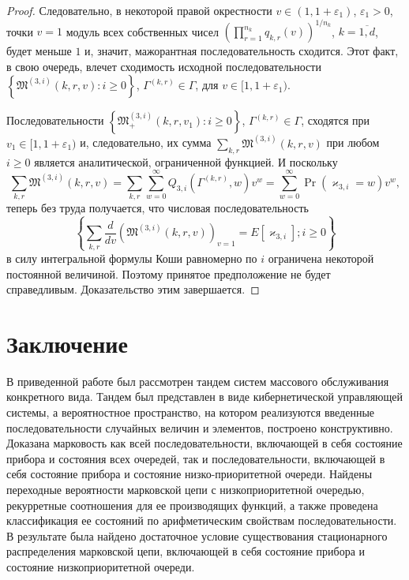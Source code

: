 \documentclass[a4paper,12pt,russian]{extarticle}
\begin{document}
\begin{proof}
Следовательно, в некоторой правой окрестности $v \in (1, 1 + \varepsilon_1)$, $\varepsilon_1 > 0$, точки $v=1$ модуль всех собственных чисел $\left(\prod_{r=1}^{n_k}q_{k,r} (v)\right)^{1/n_k}$, $k=\overline{1,d}$, будет меньше $1$ и, значит, мажорантная последовательность сходится. Этот факт, в свою очередь, влечет сходимость исходной последовательности $\left\{\mathfrak{M}^{(3,i)}(k,r,v)\colon i \geqslant 0\right\}$, $\Gamma^{(k,r)} \in \Gamma$, для $v \in [1, 1 + \varepsilon_1)$.

Последовательности $\left\{\mathfrak{M}_+^{(3,i)}(k,r,v_1)\colon i \geqslant 0\right\}$, $\Gamma^{(k,r)} \in \Gamma$, сходятся при $v_1 \in [1,1+\varepsilon_1)$ и, следовательно, их сумма 
$\sum_{k,r} \mathfrak{M}^{(3,i)}(k,r,v)$ при любом $i\geqslant 0$ является аналитической, ограниченной  функцией.
И поскольку
\begin{equation}
\sum_{k,r} \mathfrak{M}^{(3,i)}(k,r,v) = \sum_{k,r} \sum_{w=0}^{\infty} Q_{3,i}(\Gamma^{(k,r)},w) v^w = 
 \sum_{w=0}^{\infty} \Pr(\varkappa_{3,i}=w) v^w,
\end{equation}
теперь без труда получается, что числовая последовательность 
$$
\left\{\sum_{k,r} \frac{d}{dv}\left(\mathfrak{M}^{(3,i)}(k,r,v)\right)_{v=1}= E[\varkappa_{3,i}]; i\geqslant 0\right\} 
$$
в силу интегральной формулы Коши равномерно по $i$ ограничена некоторой постоянной величиной. Поэтому принятое предположение не будет справедливым. Доказательство этим завершается.
\end{proof}

\section{Заключение}
В приведенной работе был рассмотрен тандем систем массового обслуживания конкретного вида. Тандем был представлен в виде кибернетической управляющей системы, а вероятностное пространство, на котором реализуются введенные последовательности случайных величин и элементов, построено конструктивно. Доказана марковость как всей последовательности, включающей в себя состояние прибора и состояния всех очередей, так и последовательности, включающей в себя состояние прибора и состояние низко-приоритетной очереди. Найдены переходные вероятности марковской цепи с низкоприоритетной очередью, рекурретные соотношения для ее производящих функций, а также проведена классификация ее состояний по арифметическим свойствам последовательности. В результате была найдено достаточное условие существования стационарного распределения марковской цепи, включающей в себя состояние прибора и состояние низкоприоритетной очереди.
\end{document}
